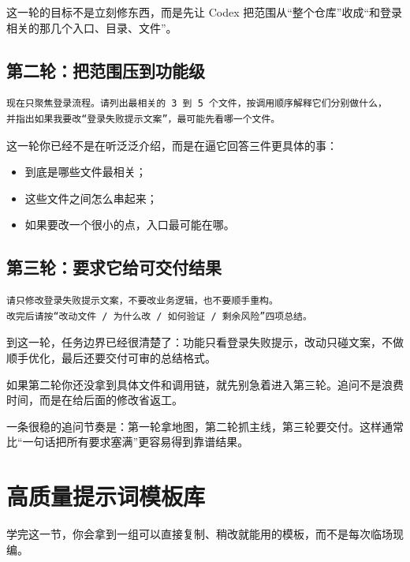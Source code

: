\documentclass[UTF8,a4paper,12pt]{ctexart}
\begin{document}
这一轮的目标不是立刻修东西，而是先让 Codex 把范围从“整个仓库”收成“和登录相关的那几个入口、目录、文件”。

\subsection{第二轮：把范围压到功能级}

\begin{lstlisting}[style=prompt]
现在只聚焦登录流程。请列出最相关的 3 到 5 个文件，按调用顺序解释它们分别做什么，
并指出如果我要改“登录失败提示文案”，最可能先看哪一个文件。
\end{lstlisting}

这一轮你已经不是在听泛泛介绍，而是在逼它回答三件更具体的事：
\begin{itemize}
  \item 到底是哪些文件最相关；
  \item 这些文件之间怎么串起来；
  \item 如果要改一个很小的点，入口最可能在哪。
\end{itemize}

\subsection{第三轮：要求它给可交付结果}

\begin{lstlisting}[style=prompt]
请只修改登录失败提示文案，不要改业务逻辑，也不要顺手重构。
改完后请按“改动文件 / 为什么改 / 如何验证 / 剩余风险”四项总结。
\end{lstlisting}

到这一轮，任务边界已经很清楚了：功能只看登录失败提示，改动只碰文案，不做顺手优化，最后还要交付可审的总结格式。

\begin{warnbox}
如果第二轮你还没拿到具体文件和调用链，就先别急着进入第三轮。追问不是浪费时间，而是在给后面的修改省返工。
\end{warnbox}

\begin{sumbox}
一条很稳的追问节奏是：第一轮拿地图，第二轮抓主线，第三轮要交付。这样通常比“一句话把所有要求塞满”更容易得到靠谱结果。
\end{sumbox}

\section{高质量提示词模板库}

\begin{learnbox}
学完这一节，你会拿到一组可以直接复制、稍改就能用的模板，而不是每次临场现编。
\end{learnbox}
\end{document}
